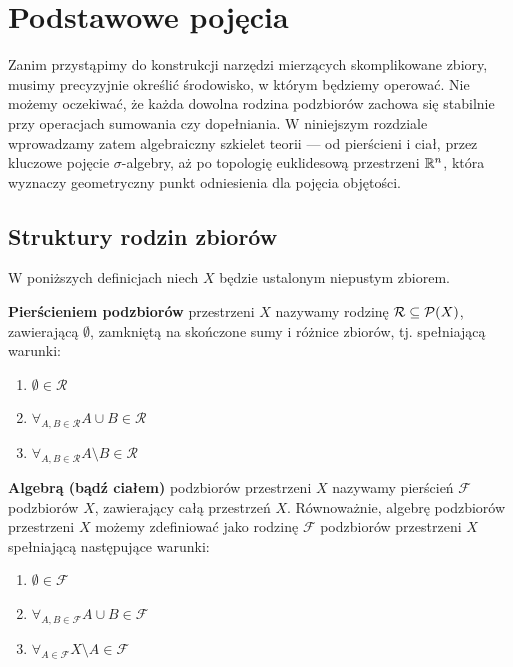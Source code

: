 \section{Podstawowe pojęcia}
Zanim przystąpimy do konstrukcji narzędzi mierzących skomplikowane zbiory, musimy precyzyjnie określić środowisko, w którym będziemy operować. Nie możemy oczekiwać, że każda dowolna rodzina podzbiorów zachowa się stabilnie przy operacjach sumowania czy dopełniania. W niniejszym rozdziale wprowadzamy zatem algebraiczny szkielet teorii — od pierścieni i ciał, przez kluczowe pojęcie $\sigma$-algebry, aż po topologię euklidesową przestrzeni $\mathbb{R}^{n}$, która wyznaczy geometryczny punkt odniesienia dla pojęcia objętości.

\subsection{Struktury rodzin zbiorów}
W poniższych definicjach niech $X$ będzie ustalonym niepustym zbiorem.
\begin{defi}
    \textbf{Pierścieniem podzbiorów} przestrzeni $X$ nazywamy rodzinę $\mathcal{R} \subseteq \mathcal{P}(X)$, zawierającą $\emptyset$, zamkniętą na skończone sumy i różnice zbiorów, tj. spełniającą warunki:
    \begin{enumerate}
        \item $\emptyset \in \mathcal{R}$
        \item $\forall_{A, B \in \mathcal{R}} A \cup B \in \mathcal{R}$
        \item $\forall_{A, B \in \mathcal{R}} A \setminus B \in \mathcal{R}$
    \end{enumerate}
\end{defi}

\begin{defi}
    \textbf{Algebrą (bądź ciałem)} podzbiorów przestrzeni $X$  nazywamy pierścień $\mathcal{F}$ podzbiorów $X$, zawierający całą przestrzeń $X$. Równoważnie, algebrę podzbiorów przestrzeni $X$ możemy zdefiniować jako rodzinę $\mathcal{F}$ podzbiorów przestrzeni $X$ spełniającą następujące warunki:
    \begin{enumerate}
        \item $\emptyset \in \mathcal{F}$
        \item $\forall_{A,B \in \mathcal{F}} A \cup B \in \mathcal{F}$
        \item $\forall_{A \in \mathcal{F}} X \setminus A \in \mathcal{F}$
    \end{enumerate}
\end{defi}

